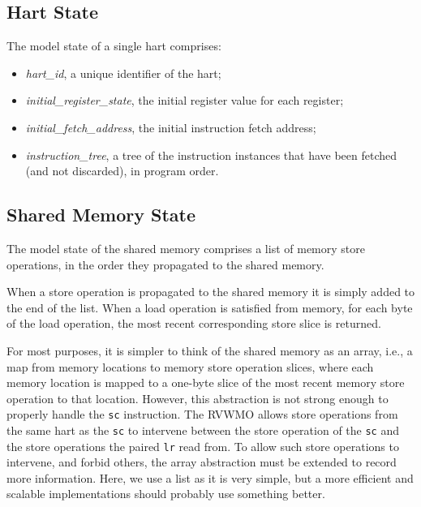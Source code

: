 \subsection{Hart State}
The model state of a single hart comprises:
\begin{itemize}
\item {\it hart\_id}, a unique identifier of the hart;
\item {\it initial\_register\_state}, the initial register value for each register;
\item {\it initial\_fetch\_address}, the initial instruction fetch address;
\item {\it instruction\_tree}, a tree of the instruction instances that have been fetched (and not discarded), in program order.
\end{itemize}


\subsection{Shared Memory State}
The model state of the shared memory comprises a list of memory store operations, in the order they propagated to the shared memory.

When a store operation is propagated to the shared memory it is simply added to the end of the list.
When a load operation is satisfied from memory, for each byte of the load operation, the most recent corresponding store slice is returned.

\begin{commentary}
For most purposes, it is simpler to think of the shared memory as an array, i.e., a map from memory locations to memory store operation slices, where each memory location is mapped to a one-byte slice of the most recent memory store operation to that location.
However, this abstraction is not strong enough to properly handle the {\tt sc} instruction.
The RVWMO  allows store operations from the same hart as the {\tt sc} to intervene between the store operation of the {\tt sc} and the store operations the paired {\tt lr} read from.
To allow such store operations to intervene, and forbid others, the array abstraction must be extended to record more information.
Here, we use a list as it is very simple, but a more efficient and scalable implementations should probably use something better.
\end{commentary}


